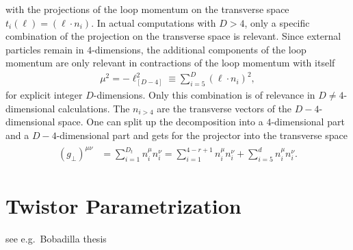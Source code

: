 with the projections of the loop momentum on the transverse space
$t_i(\ell) = (\ell \cdot n_i)$.  In actual computations with $D>4$, only a specific combination of the
projection on the transverse space is relevant. Since external
particles remain in $4$-dimensions, the additional components of the
loop momentum are only relevant in contractions of the loop momentum
with itself
\begin{align}
  \mu^2 = -\ell_{[D-4]}^2 \equiv \sum_{i=5}^D(\ell \cdot n_i)^2,
\end{align}
for explicit integer $D$-dimensions. Only this combination is of
relevance in $D\neq 4$-dimensional calculations. The $n_{i>4}$ are the transverse
vectors of the $D-4$-dimensional space. One can split up the
decomposition into a $4$-dimensional part and a $D-4$-dimensional part
and gets for the projector into the transverse space
\begin{align}\label{eq:metricprond}
\begin{split}
  (g_\perp)^{\mu\nu} &=  \sum_{i=1}^{D_t}n_i^\mu n_i^\nu=\sum_{i=1}^{4-r+1}n_i^\mu n_i^\nu +  \sum_{i=5}^{d}n_i^\mu n_i^\nu.
\end{split}
\end{align}



\chapter{Twistor Parametrization}
see e.g.\ Bobadilla thesis
